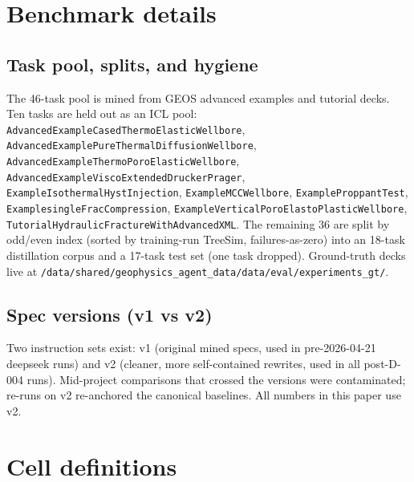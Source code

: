 \documentclass{article}
\begin{document}

\medskip

{
\small
}





\appendix

\section{Benchmark details}
\label{app:bench}

\subsection{Task pool, splits, and hygiene}
The 46-task pool is mined from GEOS advanced examples and tutorial decks. Ten tasks are held out as an ICL pool: \texttt{AdvancedExampleCasedThermoElasticWellbore}, \texttt{AdvancedExamplePureThermalDiffusionWellbore}, \texttt{AdvancedExampleThermoPoroElasticWellbore}, \texttt{AdvancedExampleViscoExtendedDruckerPrager}, \texttt{ExampleIsothermalHystInjection}, \texttt{ExampleMCCWellbore}, \texttt{ExampleProppantTest}, \texttt{ExamplesingleFracCompression}, \texttt{ExampleVerticalPoroElastoPlasticWellbore}, \texttt{TutorialHydraulicFractureWithAdvancedXML}. The remaining 36 are split by odd/even index (sorted by training-run TreeSim, failures-as-zero) into an 18-task distillation corpus and a 17-task test set (one task dropped). Ground-truth decks live at \texttt{/data/shared/geophysics\_agent\_data/data/eval/experiments\_gt/}.

\subsection{Spec versions (v1 vs v2)}
Two instruction sets exist: v1 (original mined specs, used in pre-2026-04-21 deepseek runs) and v2 (cleaner, more self-contained rewrites, used in all post-D-004 runs). Mid-project comparisons that crossed the versions were contaminated; re-runs on v2 re-anchored the canonical baselines. All numbers in this paper use v2.

\section{Cell definitions}
\label{app:cells}
\end{document}

